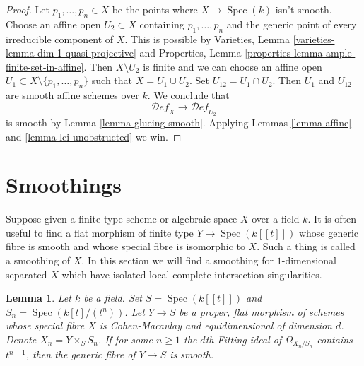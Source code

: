 \documentclass{stacks-project}
\theoremstyle{plain}
\newtheorem{lemma}[subsection]{Lemma}
\theoremstyle{definition}
\theoremstyle{remark}
\numberwithin{equation}{subsection}
\def\Spec{\mathop{\mathrm{Spec}}}
\def\Deformationcategory{\mathcal{D}\!\mathit{ef}}
\begin{document}
\begin{proof}
Let $p_1, \ldots, p_n \in X$ be the points where $X \to \Spec(k)$
isn't smooth. Choose an affine open $U_2 \subset X$ containing
$p_1, \ldots, p_n$ and the generic point of every irreducible
component of $X$. This is possible by
Varieties, Lemma \ref{varieties-lemma-dim-1-quasi-projective}
and Properties, Lemma \ref{properties-lemma-ample-finite-set-in-affine}.
Then $X \setminus U_2$ is finite and we can choose an affine open
$U_1 \subset X \setminus \{p_1, \ldots, p_n\}$ such that
$X = U_1 \cup U_2$. Set $U_{12} = U_1 \cap U_2$.
Then $U_1$ and $U_{12}$ are smooth affine schemes over $k$.
We conclude that
$$
\Deformationcategory_X \longrightarrow \Deformationcategory_{U_2}
$$
is smooth by Lemma \ref{lemma-glueing-smooth}.
Applying Lemmas \ref{lemma-affine} and \ref{lemma-lci-unobstructed} we win.
\end{proof}




\section{Smoothings}
\label{section-smoothing}

\noindent
Suppose given a finite type scheme or algebraic space $X$ over a field $k$.
It is often useful to find a flat morphism of finite type $Y \to \Spec(k[[t]])$
whose generic fibre is smooth and whose special fibre is isomorphic to $X$.
Such a thing is called a smoothing of $X$. In this section we will find
a smoothing for $1$-dimensional separated $X$ which have isolated
local complete intersection singularities.

\begin{lemma}
\label{lemma-criterion-smoothing}
Let $k$ be a field. Set $S = \Spec(k[[t]])$ and
$S_n = \Spec(k[t]/(t^n))$. Let $Y \to S$ be a proper, flat morphism
of schemes whose special fibre $X$ is Cohen-Macaulay and
equidimensional of dimension $d$. Denote $X_n = Y \times_S S_n$.
If for some $n \geq 1$ the $d$th Fitting ideal of $\Omega_{X_n/S_n}$
contains $t^{n - 1}$, then the generic fibre of $Y \to S$ is smooth.
\end{lemma}
\end{document}
